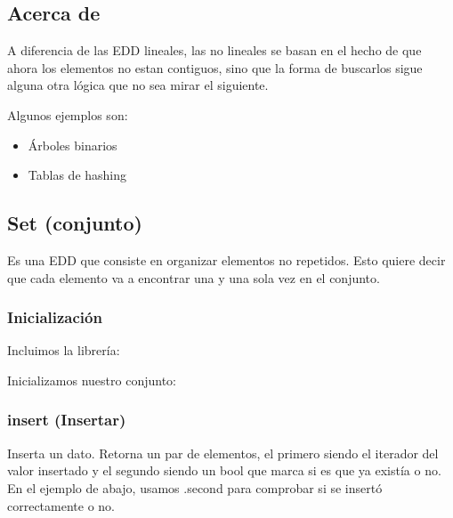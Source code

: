 \documentclass[letterpaper,10pt,spanish]{sphinxmanual}
\begin{document}
\subsection{Acerca de}
\label{\detokenize{edd/no_lineales:acerca-de}}
A diferencia de las EDD lineales, las no lineales se basan en el hecho de que ahora los elementos no estan contiguos, sino que la forma de buscarlos sigue alguna otra lógica que no sea mirar el siguiente.

Algunos ejemplos son:
\begin{itemize}
\item {} 
Árboles binarios

\item {} 
Tablas de hashing

\end{itemize}


\subsection{Set (conjunto)}
\label{\detokenize{edd/no_lineales:set-conjunto}}
Es una EDD que consiste en organizar elementos no repetidos. Esto quiere decir que cada elemento va a encontrar una y una sola vez en el conjunto.


\subsubsection{Inicialización}
\label{\detokenize{edd/no_lineales:inicializacion}}
Incluimos la librería:

\begin{sphinxVerbatim}[commandchars=\\\{\},numbers=left,firstnumber=1,stepnumber=1]
     
\end{sphinxVerbatim}

Inicializamos nuestro conjunto:

\begin{sphinxVerbatim}[commandchars=\\\{\},numbers=left,firstnumber=1,stepnumber=1]
         
\end{sphinxVerbatim}


\subsubsection{insert (Insertar)}
\label{\detokenize{edd/no_lineales:insert-insertar}}
Inserta un dato. Retorna un par de elementos, el primero siendo el iterador del valor insertado y el segundo siendo un bool que marca si es que ya existía o no. En el ejemplo de abajo, usamos .second para comprobar si se insertó correctamente o no.
\end{document}

